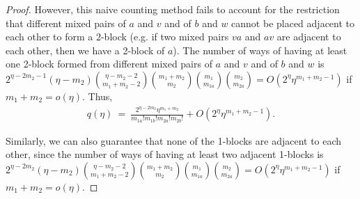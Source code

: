 \documentclass[11pt,reqno]{amsart}
\numberwithin{equation}{section}
\theoremstyle{plain}
\begin{document}
\begin{proof}
However, this naive counting method fails to account for the restriction that different mixed pairs of $a$ and $v$ and of $b$ and $w$ cannot be placed adjacent to each other to form a 2-block (e.g. if two mixed pairs $va$ and $av$ are adjacent to each other, then we have a 2-block of $a$). The number of ways of having at least one 2-block formed from different mixed pairs of $a$ and $v$ and of $b$ and $w$ is $2^{\eta-2m_2-1}(\eta-m_2)\binom{\eta-m_2-2}{m_1+m_2-2}\binom{m_1+m_2}{m_2}\binom{m_1}{m_{1a}}\binom{m_2}{m_{2a}}=O(2^\eta \eta^{m_1+m_2-1})$ if $m_1+m_2=o(\eta)$. Thus,
\begin{align}
q(\eta) \ = \ \frac{2^{\eta-2m_2}\eta^{m_1+m_2}}{m_{1a}!m_{1b}!m_{2a}!m_{2b}!}+O(2^\eta\eta^{m_1+m_2-1}).
\end{align}

Similarly, we can also guarantee that none of the 1-blocks are adjacent to each other, since the number of ways of having at least two adjacent 1-blocks is $2^{\eta-2m_2}(\eta-m_2)\binom{\eta-m_2-2}{m_1+m_2-2}\binom{m_1+m_2}{m_2}\binom{m_1}{m_{1a}}\binom{m_2}{m_{2a}}=O(2^\eta \eta^{m_1+m_2-1})$ if $m_1+m_2=o(\eta)$.



\end{proof}
\end{document}
